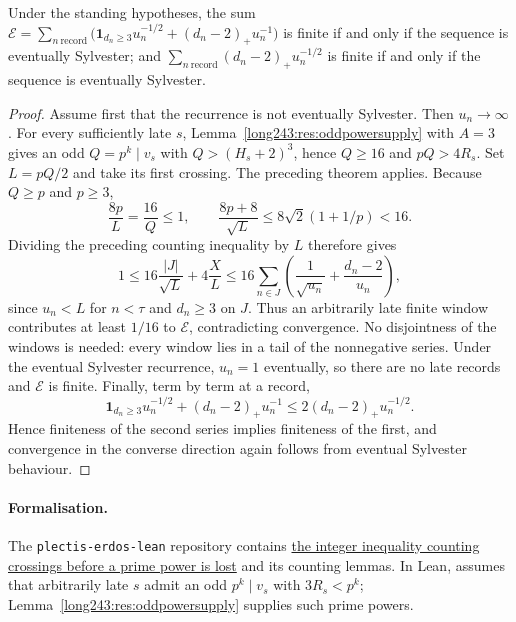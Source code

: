\begin{theorem}\label{long243:res:energycriterion}
Under the standing hypotheses, the sum
$\mathcal E=\sum_{n\ \mathrm{record}}\bigl(\mathbf 1_{d_n\ge3}u_n^{-1/2}
+(d_n-2)_+u_n^{-1}\bigr)$ is finite if and only if the sequence is eventually Sylvester; and
$\sum_{n\ \mathrm{record}}(d_n-2)_+u_n^{-1/2}$ is finite if and only if the sequence is eventually Sylvester.
\end{theorem}

\begin{proof}
Assume first that the recurrence is not eventually Sylvester. Then $u_n\to\infty$.
For every sufficiently late $s$, Lemma~\ref{long243:res:oddpowersupply}
with $A=3$ gives an odd $Q=p^k\mid v_s$ with
$Q>(H_s+2)^3$, hence $Q\ge16$ and $pQ>4R_s$.
Set $L=pQ/2$ and take its first crossing. The preceding theorem applies.
Because $Q\ge p$ and $p\ge3$,
\[
 \frac{8p}{L}=\frac{16}{Q}\le1,
 \qquad \frac{8p+8}{\sqrt L}
 \le8\sqrt2(1+1/p)<16.
\]
Dividing the preceding counting inequality by $L$ therefore gives
\[
 1\le16\frac{|J|}{\sqrt L}+4\frac{X}{L}
 \le16\sum_{n\in J}\left(\frac1{\sqrt{u_n}}+
                  \frac{d_n-2}{u_n}\right),
\]
since $u_n<L$ for $n<\tau$ and $d_n\ge3$ on $J$.
Thus an arbitrarily late finite window contributes at least $1/16$ to
$\mathcal E$, contradicting convergence. No disjointness of the windows is
needed: every window lies in a tail of the nonnegative series.
Under the eventual Sylvester recurrence, $u_n=1$ eventually, so there are no late records and
$\mathcal E$ is finite.
Finally, term by term at a record,
\[
 \mathbf1_{d_n\ge3}u_n^{-1/2}+(d_n-2)_+u_n^{-1}
 \le2(d_n-2)_+u_n^{-1/2}.
\]
Hence finiteness of the second series implies finiteness of the first,
and convergence in the converse direction again follows from eventual Sylvester behaviour.
\end{proof}

\paragraph{Formalisation.}
The \texttt{plectis-erdos-lean} repository contains
\href{https://github.com/wcook04/plectis-erdos-lean/blob/52f29ad173b04e3bac941b3663f2b9aebe5de0bb/ErdosProblems/Erdos243/ProtectedEpochEnergy.lean\#L185}{the integer inequality counting crossings before a prime power is lost}
and its counting lemmas.
In Lean,
assumes that arbitrarily late $s$ admit an odd $p^k\mid v_s$ with
$3R_s<p^k$; Lemma~\ref{long243:res:oddpowersupply} supplies such prime
powers.

